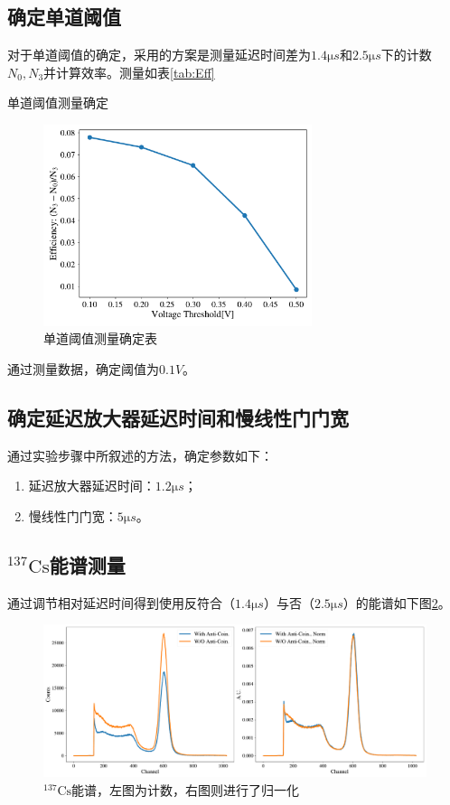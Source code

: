 \documentclass{article}
\begin{document}
\subsection{确定单道阈值}
对于单道阈值的确定，采用的方案是测量延迟时间差为$1.4\si{\micro s}$和$2.5\si{\micro s}$下的计数$N_0,N_3$并计算效率。测量如表\ref{tab:Eff}
\begin{table}[htbp]
    \centering
    \caption{单道阈值测量确定\label{tab:Eff}}
    
\end{table}
\begin{figure}[htbp]
    \centering
    \includegraphics[width=0.7\textwidth]{../plots/Efficiency.pdf}
    \caption{单道阈值测量确定表\label{fig:Eff}}
\end{figure}

通过测量数据，确定阈值为$0.1\si{V}$。
\subsection{确定延迟放大器延迟时间和慢线性门门宽}
通过实验步骤中所叙述的方法，确定参数如下：
\begin{enumerate}
    \item 延迟放大器延迟时间：$1.2\si{\micro s}$；
    \item 慢线性门门宽：$5\si{\micro s}$。
\end{enumerate}
\subsection{$^{137}\text{Cs}$能谱测量}
    通过调节相对延迟时间得到使用反符合（$1.4\si{\micro s}$）与否（$2.5\si{\micro s}$）的能谱如下图\ref{fig:Spec}。
    \begin{figure}[htbp]
        \centering
        \includegraphics[width=\textwidth]{../plots/Spec.pdf}
        \caption{$^{137}\text{Cs}$能谱，左图为计数，右图则进行了归一化\label{fig:Spec}}
    \end{figure}
\end{document}
